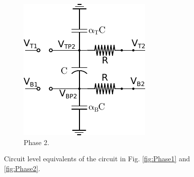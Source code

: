 \begin{figure}
\begin{subfigure}{0.35\linewidth}
			\includegraphics[width=\linewidth]{4Terminal/Figures/Phase2EQ.pdf}
			\caption{Phase 2.}
			\label{fig:Phase2Res}
		\end{subfigure}
	\caption{Circuit level equivalents of the circuit in Fig. \ref{fig:Phase1} and \ref{fig:Phase2}.}
	\end{figure}
	
